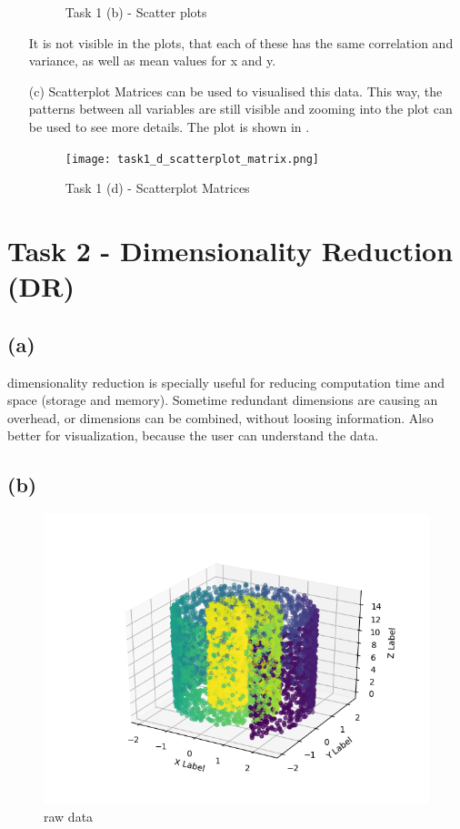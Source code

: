 \documentclass[a4paper]{article}
\begin{document}
\begin{enumerate}
\begin{figure}[!ht]
		
		
		\caption{Task 1 (b) - Scatter plots}
		\label{scatterplots}
	\end{figure}
	
	It is not visible in the plots, that each of these has the same correlation and variance, as well as mean values for x and y. 
	
	\item[(c)] Scatterplot Matrices can be used to visualised this data. 
	This way, the patterns between all variables are still visible and zooming into the plot can be used to see more details. 
	The plot is shown in .
	\begin{figure}[!ht]
		\texttt{[image: task1\_d\_scatterplot\_matrix.png]}
		
		\caption{Task 1 (d) - Scatterplot Matrices }
		\label{scatterplots_d}
	\end{figure}
	
\end{enumerate}

\newpage
\section*{Task 2 - Dimensionality Reduction (DR)}

\subsection*{(a)}
dimensionality reduction is specially useful for reducing computation time and space (storage and memory). Sometime redundant dimensions are causing an overhead, or dimensions can be combined, without loosing information. Also better for visualization, because the user can understand the data.

\subsection*{(b)}
\begin{figure}[!ht]
	\centering
	\includegraphics[width=0.7\linewidth]{swiss_roll}
	\caption{raw data}
\end{figure}
\end{document}
